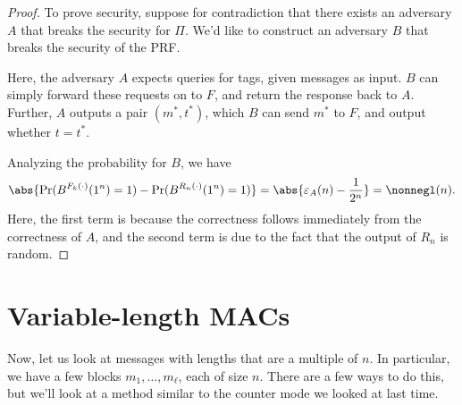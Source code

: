 \documentclass[12pt]{tufte-book}
\begin{document}
\begin{proof}
    To prove security, suppose for contradiction that there exists an adversary $A$ that breaks the security for $\Pi$. We'd like to construct an adversary $B$ that breaks the security of the PRF.

    Here, the adversary $A$ expects queries for tags, given messages as input. $B$ can simply forward these requests on to $F$, and return the response back to $A$. Further, $A$ outputs a pair $(m^*, t^*)$, which $B$ can send $m^*$ to $F$, and output whether $t = t^*$.

    \begin{center}
    \end{center}

    Analyzing the probability for $B$, we have
    \[
        \abs{\Pr(B^{F_k(\cdot)}(1^n) = 1) - \Pr(B^{R_n(\cdot)}(1^n) = 1)}
        = \abs{\varepsilon_A(n) - \frac{1}{2^n}}
        = \nonnegl(n)
    .\]
    Here, the first term is because the correctness follows immediately from the correctness of $A$, and the second term is due to the fact that the output of $R_n$ is random.
\end{proof}

\section{Variable-length MACs}

Now, let us look at messages with lengths that are a multiple of $n$. In particular, we have a few blocks $m_1, \ldots, m_{\ell}$, each of size $n$. There are a few ways to do this, but we'll look at a method similar to the counter mode we looked at last time.
\end{document}
